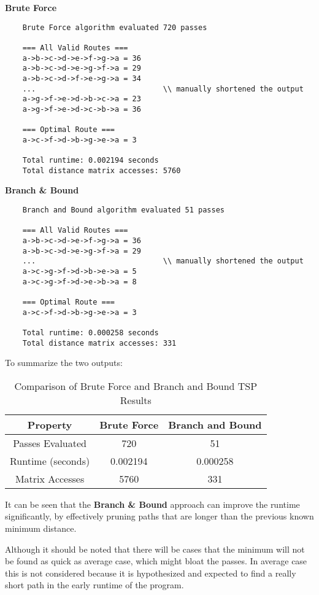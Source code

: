 \textbf{Brute Force}
\begin{verbatim}
    Brute Force algorithm evaluated 720 passes

    === All Valid Routes ===
    a->b->c->d->e->f->g->a = 36
    a->b->c->d->e->g->f->a = 29
    a->b->c->d->f->e->g->a = 34
    ...                             \\ manually shortened the output
    a->g->f->e->d->b->c->a = 23
    a->g->f->e->d->c->b->a = 36
    
    === Optimal Route ===
    a->c->f->d->b->g->e->a = 3
    
    Total runtime: 0.002194 seconds
    Total distance matrix accesses: 5760
\end{verbatim}
\textbf{Branch \& Bound}
\begin{verbatim}
    Branch and Bound algorithm evaluated 51 passes

    === All Valid Routes ===
    a->b->c->d->e->f->g->a = 36
    a->b->c->d->e->g->f->a = 29
    ...                             \\ manually shortened the output
    a->c->g->f->d->b->e->a = 5
    a->c->g->f->d->e->b->a = 8

    === Optimal Route ===
    a->c->f->d->b->g->e->a = 3

    Total runtime: 0.000258 seconds
    Total distance matrix accesses: 331
\end{verbatim}

To summarize the two outputs:

\begin{table}[H]
    \centering
        \begin{tabular}{|c|c|c|}
        \hline
                \textbf{Property} & \textbf{Brute Force} & \textbf{Branch and Bound} \\
            \hline
                Passes Evaluated         & 720   & 51    \\
            \hline
                Runtime (seconds)        & 0.002194 & 0.000258 \\
            \hline
                Matrix Accesses          & 5760  & 331   \\
            \hline
        \end{tabular}
            \caption{Comparison of Brute Force and Branch and Bound TSP Results}
\end{table}
    
It can be seen that the \textbf{Branch \& Bound} approach can improve the runtime significantly, by effectively pruning paths that are longer than the previous known minimum distance.

Although it should be noted that there will be cases that the minimum will not be found as quick as average case, which might bloat the passes. In average case this is not considered because it is hypothesized and expected to find a really short path in the early runtime of the program.
